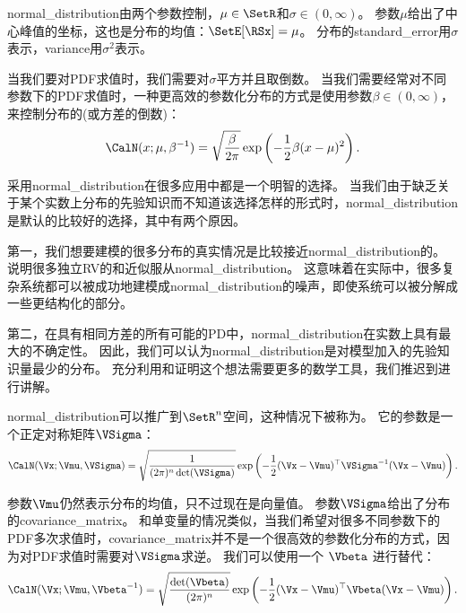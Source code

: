 \gls{normal_distribution}由两个参数控制，$\mu \in \SetR$和$\sigma \in (0, \infty)$。
参数$\mu$给出了中心峰值的坐标，这也是分布的均值：$\SetE[\RSx] = \mu$。
分布的\gls{standard_error}用$\sigma$表示，\gls{variance}用$\sigma^2$表示。

当我们要对\gls{PDF}求值时，我们需要对$\sigma$平方并且取倒数。
当我们需要经常对不同参数下的\gls{PDF}求值时，一种更高效的参数化分布的方式是使用参数$\beta \in (0, \infty)$，来控制分布的(或方差的倒数)：
\begin{equation}
\CalN(x; \mu, \beta^{-1}) = \sqrt{\frac{\beta}{2\pi}} \exp \left(  -\frac{1}{2}\beta (x-\mu)^2 \right).
\label{eq:3.22}
\end{equation}

采用\gls{normal_distribution}在很多应用中都是一个明智的选择。
当我们由于缺乏关于某个实数上分布的先验知识而不知道该选择怎样的形式时，\gls{normal_distribution}是默认的比较好的选择，其中有两个原因。


第一，我们想要建模的很多分布的真实情况是比较接近\gls{normal_distribution}的。
说明很多独立\gls{RV}的和近似服从\gls{normal_distribution}。
这意味着在实际中，很多复杂系统都可以被成功地建模成\gls{normal_distribution}的噪声，即使系统可以被分解成一些更结构化的部分。

第二，在具有相同方差的所有可能的\gls{PD}中，\gls{normal_distribution}在实数上具有最大的不确定性。
因此，我们可以认为\gls{normal_distribution}是对模型加入的先验知识量最少的分布。
充分利用和证明这个想法需要更多的数学工具，我们推迟到进行讲解。

\gls{normal_distribution}可以推广到$\SetR^n$空间，这种情况下被称为。
它的参数是一个正定对称矩阵$\VSigma$：
\begin{equation}
\label{eq:3.23}
\CalN(\Vx; \Vmu, \VSigma) = \sqrt{ \frac{1}{ (2\pi)^n \det(\VSigma)}}  \exp \left ( -\frac{1}{2} (\Vx-\Vmu)^\top \VSigma^{-1} (\Vx- \Vmu) \right).
\end{equation}

参数$\Vmu$仍然表示分布的均值，只不过现在是向量值。
参数$\VSigma$给出了分布的\gls{covariance_matrix}。
和单变量的情况类似，当我们希望对很多不同参数下的\gls{PDF}多次求值时，\gls{covariance_matrix}并不是一个很高效的参数化分布的方式，因为对\gls{PDF}求值时需要对$\VSigma$求逆。
我们可以使用一个 $\Vbeta$ 进行替代：
\begin{equation}
\CalN(\Vx; \Vmu, \Vbeta^{-1}) = \sqrt{ \frac{\det(\Vbeta)}{ (2\pi)^n}}  \exp \left ( -\frac{1}{2} (\Vx-\Vmu)^\top \Vbeta (\Vx- \Vmu) \right).
\end{equation}

